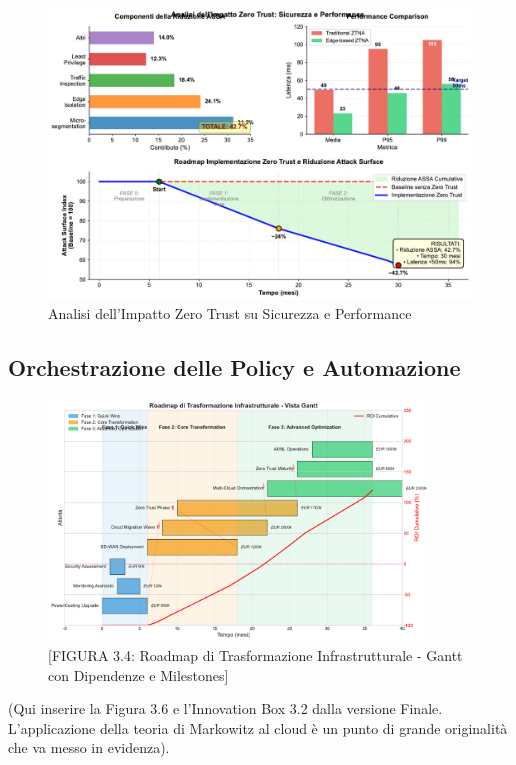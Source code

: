 \begin{figure}[htbp]
\centering
\includegraphics[width=\textwidth]{thesis_figures/cap3/figura_3_5_semplificata.pdf}
\caption{Analisi dell'Impatto Zero Trust su Sicurezza e Performance}
\label{fig:zero_trust_impact}
\end{figure}
\subsection{Orchestrazione delle Policy e Automazione}

\begin{figure}[htbp]
\centering
\includegraphics[width=0.9\textwidth]{thesis_figures/cap3/figura_3_4_roadmap.pdf}
\caption{[FIGURA 3.4: Roadmap di Trasformazione Infrastrutturale - Gantt con Dipendenze e Milestones]}
\label{fig:roadmap_transformation}
\end{figure}

(Qui inserire la Figura 3.6 e l'Innovation Box 3.2 dalla versione Finale. L'applicazione della teoria di Markowitz al cloud è un punto di grande originalità che va messo in evidenza).
